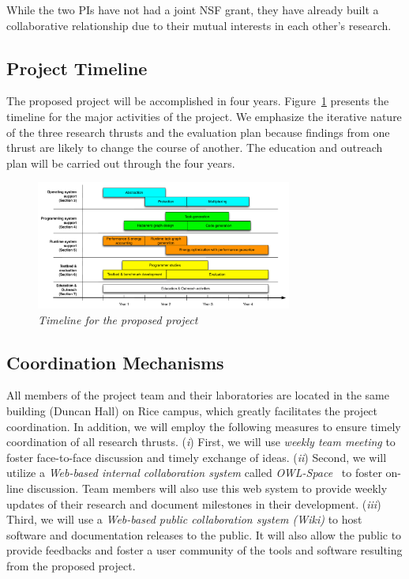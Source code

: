 While the two PIs have not had a joint NSF grant, they have already built a collaborative relationship due to their mutual interests in each other's research. 

\subsection*{Project Timeline\label{sec:management}}
The proposed project will be accomplished in four years. Figure~\ref{fig:timeline} presents the timeline for the major activities of the project. We emphasize the iterative nature of the three research thrusts and the evaluation plan because findings from one thrust are likely to change the course of another.  The education and outreach plan will be carried out through the four years.


\begin{figure}
    \centering
 \includegraphics[width=0.75\textwidth]{figs/task-timeline}
    \caption{\textit{Timeline for the proposed project}}
    \label{fig:timeline}
\end{figure}

\subsection*{Coordination Mechanisms}
All members of the project team and their laboratories are located in the same building (Duncan Hall) on Rice campus, which greatly facilitates the project coordination. In addition, we will employ the following measures to ensure timely coordination of all research thrusts. (\textit{i}) First, we will use \emph{weekly team meeting} to foster face-to-face discussion and timely exchange of ideas. (\textit{ii}) Second, we will utilize  a \emph{Web-based internal collaboration system} called \emph{OWL-Space}~\cite{owlspace} to foster on-line discussion. Team members will also use this web system to provide weekly updates of their research and document milestones in their development.  (\textit{iii}) Third, we will use a \emph{Web-based public collaboration system (Wiki)} to host software and documentation releases to the public. It will also allow the public to provide feedbacks and foster a user community of the tools and software resulting from the proposed project. 
